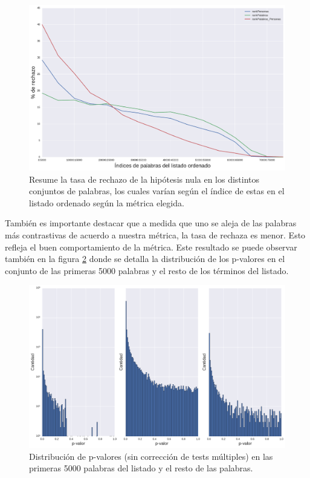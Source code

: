 \begin{figure}[!ht]\centering
  
    \includegraphics[width=\linewidth]{./images/rechazo_metricas.pdf}
    \caption{Resume la tasa de rechazo de la hipótesis nula en los distintos conjuntos de palabras, los cuales varían según el índice de estas en el listado ordenado según la métrica elegida.} 
    \label{fig:rechazo_metricas} 

\end{figure}

También es importante destacar que a medida que uno se aleja de las palabras más contrastivas de acuerdo a nuestra métrica, la tasa de rechaza es menor. Esto refleja el buen comportamiento de la métrica. Este resultado se puede observar también en la figura \ref{fig:pvalores_sinBonferroni} donde se detalla la distribución de los p-valores en el conjunto de las primeras 5000 palabras y el resto de los términos del listado.

\begin{figure}[!ht]\centering
  
    \includegraphics[width=\linewidth]{./images/pvalores_sinBonferroni.pdf}
    \caption{Distribución de p-valores (sin corrección de tests múltiples) en las primeras 5000 palabras del listado y el resto de las palabras.} 
    \label{fig:pvalores_sinBonferroni} 

\end{figure}

